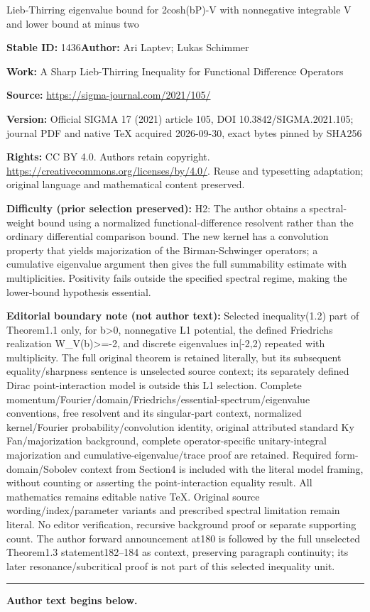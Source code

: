\documentclass[11pt]{article}
\numberwithin{equation}{section}
\numberwithin{equation}{section}
\begin{document}
\begin{center}\Large Lieb-Thirring eigenvalue bound for 2cosh(bP)-V with nonnegative integrable V and lower bound at minus two\end{center}
\noindent\textbf{Stable ID:} 1436\quad\textbf{Author:} Ari Laptev; Lukas Schimmer\par
\noindent\textbf{Work:} A Sharp Lieb-Thirring Inequality for Functional Difference Operators\par
\noindent\textbf{Source:} \url{https://sigma-journal.com/2021/105/}\par
\noindent\textbf{Version:} Official SIGMA 17 (2021) article 105, DOI 10.3842/SIGMA.2021.105; journal PDF and native TeX acquired 2026-09-30, exact bytes pinned by SHA256\par
\noindent\textbf{Rights:} CC BY 4.0. Authors retain copyright. \url{https://creativecommons.org/licenses/by/4.0/}. Reuse and typesetting adaptation; original language and mathematical content preserved.\par
\noindent\textbf{Difficulty (prior selection preserved):} {\CJKfont H2: The author obtains a spectral-weight bound using a normalized functional-difference resolvent rather than the ordinary differential comparison bound. The new kernel has a convolution property that yields majorization of the Birman-Schwinger operators; a cumulative eigenvalue argument then gives the full summability estimate with multiplicities. Positivity fails outside the specified spectral regime, making the lower-bound hypothesis essential.}\par
\medskip\noindent\textbf{Editorial boundary note (not author text):} Selected inequality(1.2) part of Theorem1.1 only, for b>0, nonnegative L1 potential, the defined Friedrichs realization W\_V(b)>=-2, and discrete eigenvalues in[-2,2) repeated with multiplicity. The full original theorem is retained literally, but its subsequent equality/sharpness sentence is unselected source context; its separately defined Dirac point-interaction model is outside this L1 selection. Complete momentum/Fourier/domain/Friedrichs/essential-spectrum/eigenvalue conventions, free resolvent and its singular-part context, normalized kernel/Fourier probability/convolution identity, original attributed standard Ky Fan/majorization background, complete operator-specific unitary-integral majorization and cumulative-eigenvalue/trace proof are retained. Required form-domain/Sobolev context from Section4 is included with the literal model framing, without counting or asserting the point-interaction equality result. All mathematics remains editable native TeX. Original source wording/index/parameter variants and prescribed spectral limitation remain literal. No editor verification, recursive background proof or separate supporting count. The author forward announcement at180 is followed by the full unselected Theorem1.3 statement182–184 as context, preserving paragraph continuity; its later resonance/subcritical proof is not part of this selected inequality unit.\par
\medskip\hrule\medskip\noindent\textbf{Author text begins below.}\par
\end{document}
